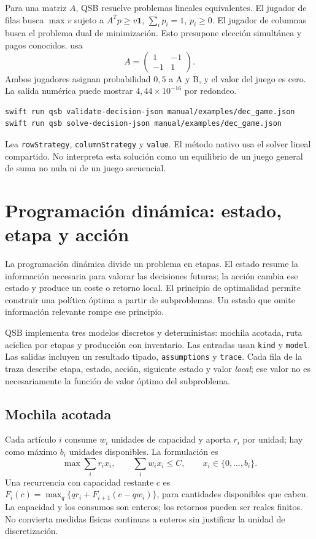 Para una matriz $A$, QSB resuelve problemas lineales equivalentes. El jugador
de filas busca $\max v$ sujeto a $A^Tp\geq v\mathbf{1}$,
$\sum_i p_i=1$, $p_i\geq0$. El jugador de columnas busca el problema dual de
minimización. Esto presupone elección simultánea y pagos conocidos.
 usa
\[
 A=\begin{pmatrix}1&-1\\-1&1\end{pmatrix}.
\]
Ambos jugadores asignan probabilidad $0{,}5$ a A y B, y el valor del juego es
cero. La salida numérica puede mostrar $4{,}44\times10^{-16}$ por redondeo.
\begin{lstlisting}
swift run qsb validate-decision-json manual/examples/dec_game.json
swift run qsb solve-decision-json manual/examples/dec_game.json
\end{lstlisting}
Lea \texttt{rowStrategy}, \texttt{columnStrategy} y \texttt{value}. El método
nativo usa el solver lineal compartido. No interpreta esta solución como un
equilibrio de un juego general de suma no nula ni de un juego secuencial.

\section{Programación dinámica: estado, etapa y acción}
La programación dinámica divide un problema en etapas. El estado resume la
información necesaria para valorar las decisiones futuras; la acción cambia
ese estado y produce un coste o retorno local. El principio de optimalidad
permite construir una política óptima a partir de subproblemas. Un estado que
omite información relevante rompe ese principio.

QSB implementa tres modelos discretos y deterministas: mochila acotada,
ruta acíclica por etapas y producción con inventario. Las entradas usan
\texttt{kind} y \texttt{model}. Las salidas incluyen un resultado tipado,
\texttt{assumptions} y \texttt{trace}. Cada fila de la traza describe etapa,
estado, acción, siguiente estado y valor \emph{local}; ese valor no es
necesariamente la función de valor óptimo del subproblema.

\subsection{Mochila acotada}
Cada artículo $i$ consume $w_i$ unidades de capacidad y aporta $r_i$ por unidad;
hay como máximo $b_i$ unidades disponibles. La formulación es
\[
 \max\sum_i r_i x_i,\qquad \sum_i w_i x_i\leq C,
 \qquad x_i\in\{0,\ldots,b_i\}.
\]
Una recurrencia con capacidad restante $c$ es
$F_i(c)=\max_q\{q r_i+F_{i+1}(c-qw_i)\}$, para cantidades disponibles que
caben. La capacidad y los consumos son enteros; los retornos pueden ser reales
finitos. No convierta medidas físicas continuas a enteros sin justificar la
unidad de discretización.

